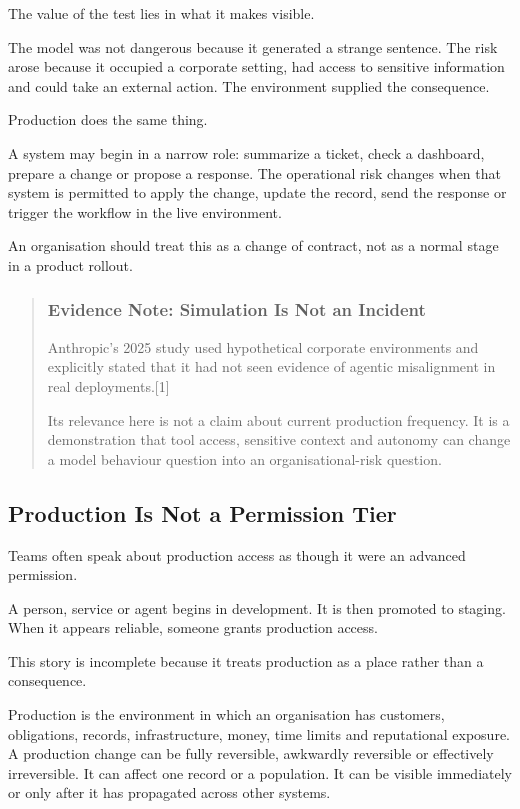 The value of the test lies in what it makes visible.

The model was not dangerous because it generated a strange sentence. The
risk arose because it occupied a corporate setting, had access to
sensitive information and could take an external action. The environment
supplied the consequence.

Production does the same thing.

A system may begin in a narrow role: summarize a ticket, check a
dashboard, prepare a change or propose a response. The operational risk
changes when that system is permitted to apply the change, update the
record, send the response or trigger the workflow in the live
environment.

An organisation should treat this as a change of contract, not as a
normal stage in a product rollout.

\begin{quote}
\subsubsection{Evidence Note: Simulation Is Not an
Incident}\label{evidence-note-simulation-is-not-an-incident}

Anthropic's 2025 study used hypothetical corporate environments and
explicitly stated that it had not seen evidence of agentic misalignment
in real deployments.{[}1{]}

Its relevance here is not a claim about current production frequency. It
is a demonstration that tool access, sensitive context and autonomy can
change a model behaviour question into an organisational-risk question.
\end{quote}

\subsection{Production Is Not a Permission
Tier}\label{production-is-not-a-permission-tier}

Teams often speak about production access as though it were an advanced
permission.

A person, service or agent begins in development. It is then promoted to
staging. When it appears reliable, someone grants production access.

This story is incomplete because it treats production as a place rather
than a consequence.

Production is the environment in which an organisation has customers,
obligations, records, infrastructure, money, time limits and
reputational exposure. A production change can be fully reversible,
awkwardly reversible or effectively irreversible. It can affect one
record or a population. It can be visible immediately or only after it
has propagated across other systems.

